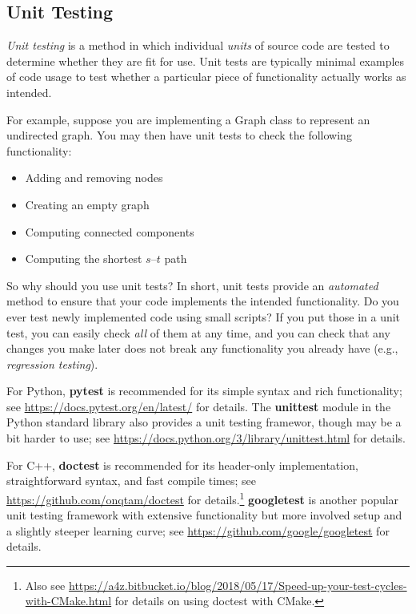\documentclass[12pt]{article}
\begin{document}
\subsection{Unit Testing} \label{sec:unit-testing}
\emph{Unit testing} is a method in which individual \emph{units} of source code are tested to determine whether they are fit for use. Unit tests are typically minimal examples of code usage to test whether a particular piece of functionality actually works as intended.

For example, suppose you are implementing a Graph class to represent an undirected graph. You may then have unit tests to check the following functionality:
\begin{itemize}
    \item Adding and removing nodes
    \item Creating an empty graph
    \item Computing connected components
    \item Computing the shortest $s$--$t$ path
\end{itemize}

So why should you use unit tests? In short, unit tests provide an \emph{automated} method to ensure that your code implements the intended functionality. Do you ever test newly implemented code using small scripts? If you put those in a unit test, you can easily check \emph{all} of them at any time, and you can check that any changes you make later does not break any functionality you already have (e.g., \emph{regression testing}).

For Python, \textbf{pytest} is recommended for its simple syntax and rich functionality; see \url{https://docs.pytest.org/en/latest/} for details. The \textbf{unittest} module in the Python standard library also provides a unit testing framewor, though may be a bit harder to use; see \url{https://docs.python.org/3/library/unittest.html} for details.

For C++, \textbf{doctest} is recommended for its header-only implementation, straightforward syntax, and fast compile times; see \url{https://github.com/onqtam/doctest} for details.\footnote{Also see \url{https://a4z.bitbucket.io/blog/2018/05/17/Speed-up-your-test-cycles-with-CMake.html} for details on using doctest with CMake.}  \textbf{googletest} is another popular unit testing framework with extensive functionality but more involved setup and a slightly steeper learning curve; see \url{https://github.com/google/googletest} for details.
\end{document}
